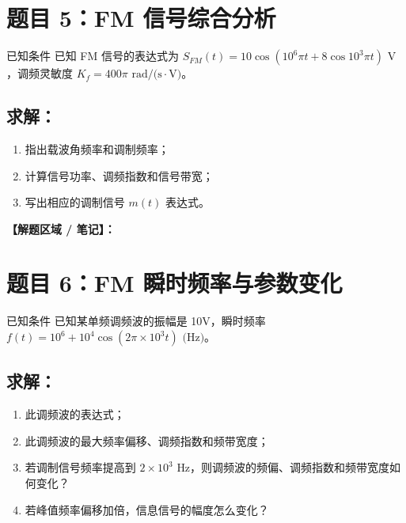 \documentclass[12pt, a4paper]{article}
\begin{document}
	\section*{题目 5：FM 信号综合分析}
	
	\begin{problembox}{已知条件}
		已知 FM 信号的表达式为 $S_{FM}(t) = 10\cos(10^6\pi t + 8\cos 10^3\pi t) \text{ V}$，调频灵敏度 $K_f = 400\pi \text{ rad/(s}\cdot\text{V)}$。
	\end{problembox}
	
	\subsection*{求解：}
	\begin{enumerate}[label=(\arabic*)]
		\item 指出载波角频率和调制频率；
		\item 计算信号功率、调频指数和信号带宽；
		\item 写出相应的调制信号 $m(t)$ 表达式。
	\end{enumerate}
	
	\noindent\textbf{【解题区域 / 笔记】：}
	
	\newpage
	
	\section*{题目 6：FM 瞬时频率与参数变化}
	
	\begin{problembox}{已知条件}
		已知某单频调频波的振幅是 10V，瞬时频率 $f(t) = 10^6 + 10^4 \cos(2\pi \times 10^3 t) \text{ (Hz)}$。
	\end{problembox}
	
	\subsection*{求解：}
	\begin{enumerate}[label=(\arabic*)]
		\item 此调频波的表达式；
		\item 此调频波的最大频率偏移、调频指数和频带宽度；
		\item 若调制信号频率提高到 $2 \times 10^3 \text{ Hz}$，则调频波的频偏、调频指数和频带宽度如何变化？
		\item 若峰值频率偏移加倍，信息信号的幅度怎么变化？
	\end{enumerate}
	
\end{document}
